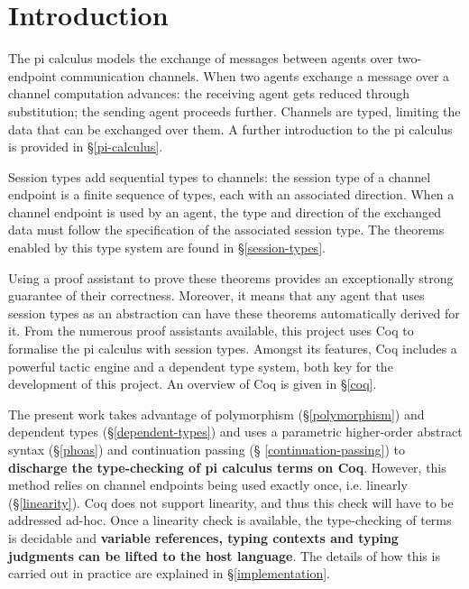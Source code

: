 \documentclass{mproj}
\begin{document}
\chapter{Introduction}\label{intro}

The pi calculus models the exchange of messages between agents over two-endpoint
communication channels. When two agents exchange a message over a channel
computation advances: the receiving agent gets reduced through substitution; the
sending agent proceeds further. Channels are typed, limiting the data that can
be exchanged over them. A further introduction to the pi calculus is provided in
\S \ref{pi-calculus}.

Session types add sequential types to channels: the session type of a channel
endpoint is a finite sequence of types, each with an associated direction.  When
a channel endpoint is used by an agent, the type and direction of the exchanged
data must follow the specification of the associated session type. The theorems
enabled by this type system are found in \S \ref{session-types}.

Using a proof assistant to prove these theorems provides an exceptionally strong
guarantee of their correctness. Moreover, it means that any agent that uses
session types as an abstraction can have these theorems automatically derived
for it. From the numerous proof assistants available, this project uses Coq to
formalise the pi calculus with session types. Amongst its features, Coq includes
a powerful tactic engine and a dependent type system, both key for the
development of this project. An overview of Coq is given in \S \ref{coq}.

The present work takes advantage of polymorphism (\S \ref{polymorphism}) and
dependent types (\S \ref{dependent-types}) and uses a parametric higher-order
abstract syntax (\S \ref{phoas}) and continuation passing (\S
\ref{continuation-passing}) to \textbf{discharge the type-checking of pi
calculus terms on Coq}. However, this method relies on channel endpoints being
used exactly once, i.e. linearly (\S \ref{linearity}). Coq does not support
linearity, and thus this check will have to be addressed ad-hoc. Once a
linearity check is available, the type-checking of terms is decidable and
\textbf{variable references, typing contexts and typing judgments can be lifted
to the host language}. The details of how this is carried out in practice are
explained in \S \ref{implementation}.
\end{document}
